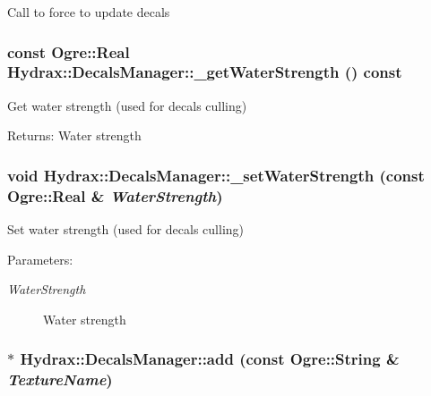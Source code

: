 Call to force to update decals \hypertarget{class_hydrax_1_1_decals_manager_7e225b232081b0cef39f7251c1e5d2ad}{
\subsubsection[{\_\-getWaterStrength}]{\setlength{\rightskip}{0pt plus 5cm}const Ogre::Real Hydrax::DecalsManager::\_\-getWaterStrength () const}}
\label{class_hydrax_1_1_decals_manager_7e225b232081b0cef39f7251c1e5d2ad}


Get water strength (used for decals culling) \begin{Desc}
\item[Returns:]Water strength \end{Desc}
\hypertarget{class_hydrax_1_1_decals_manager_64d3964e3ceb550dc5735307cad922bc}{
\subsubsection[{\_\-setWaterStrength}]{\setlength{\rightskip}{0pt plus 5cm}void Hydrax::DecalsManager::\_\-setWaterStrength (const Ogre::Real \& {\em WaterStrength})}}
\label{class_hydrax_1_1_decals_manager_64d3964e3ceb550dc5735307cad922bc}


Set water strength (used for decals culling) \begin{Desc}
\item[Parameters:]
\begin{description}
\item[{\em WaterStrength}]Water strength \end{description}
\end{Desc}
\hypertarget{class_hydrax_1_1_decals_manager_63cc52fdd0109f34e1c40b9cfb33f9ab}{
\subsubsection[{add}]{ $\ast$ Hydrax::DecalsManager::add (const Ogre::String \& {\em TextureName})}}
\label{class_hydrax_1_1_decals_manager_63cc52fdd0109f34e1c40b9cfb33f9ab}


